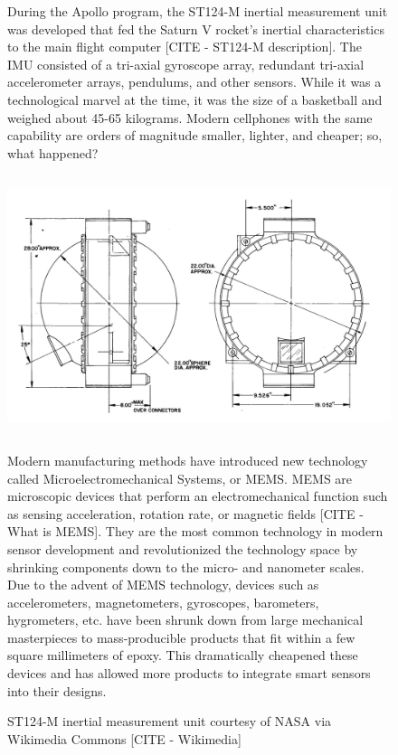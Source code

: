 \begin{figure}
    \begin{fitbox}[frametitle=Aside: MEMS Technology]
        During the Apollo program, the ST124-M inertial measurement unit was developed that fed the Saturn V rocket's inertial characteristics to the main flight computer [CITE - ST124-M description].
        The IMU consisted of a tri-axial gyroscope array, redundant tri-axial accelerometer arrays, pendulums, and other sensors.
        While it was a technological marvel at the time, it was the size of a basketball and weighed about 45-65 kilograms.
        Modern cellphones with the same capability are orders of magnitude smaller, lighter, and cheaper; so, what happened?

        \begin{center}
            \includegraphics[height=3in]{images/background/Apollo_IMU_exhibit.jpg}
            \caption[ST124-M Outline]{ST124-M inertial measurement unit courtesy of NASA via Wikimedia Commons [CITE - Wikimedia]}
        \end{center}

        Modern manufacturing methods have introduced new technology called Microelectromechanical Systems, or MEMS.
        MEMS are microscopic devices that perform an electromechanical function such as sensing acceleration, rotation rate, or magnetic fields [CITE - What is MEMS].
        They are the most common technology in modern sensor development and revolutionized the technology space by shrinking components down to the micro- and nanometer scales.
        Due to the advent of MEMS technology, devices such as accelerometers, magnetometers, gyroscopes, barometers, hygrometers, etc. have been shrunk down from large mechanical masterpieces to mass-producible products that fit within a few square millimeters of epoxy.
        This dramatically cheapened these devices and has allowed more products to integrate smart sensors into their designs.
    \end{fitbox}
\end{figure}

